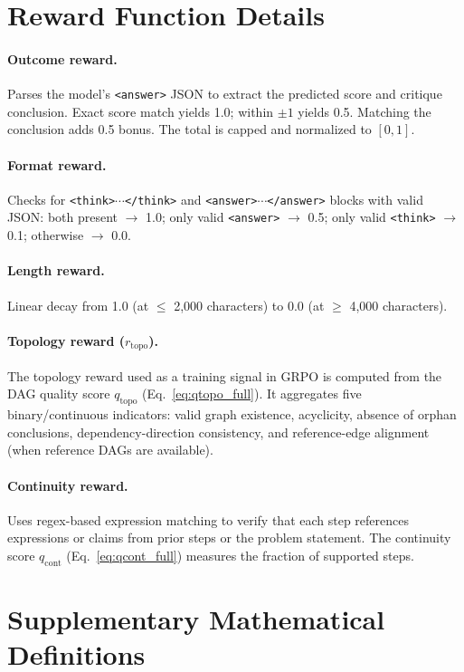 \section{Reward Function Details}
\label{app:rewards}

\paragraph{Outcome reward.}
Parses the model's \texttt{<answer>} JSON to extract the predicted score and critique conclusion.
Exact score match yields 1.0; within $\pm 1$ yields 0.5.
Matching the conclusion adds 0.5 bonus.
The total is capped and normalized to $[0, 1]$.

\paragraph{Format reward.}
Checks for \texttt{<think>$\cdots$</think>} and \texttt{<answer>$\cdots$</answer>} blocks with valid JSON:
both present $\to$ 1.0; only valid \texttt{<answer>} $\to$ 0.5; only valid \texttt{<think>} $\to$ 0.1; otherwise $\to$ 0.0.

\paragraph{Length reward.}
Linear decay from 1.0 (at $\leq$ 2,000 characters) to 0.0 (at $\geq$ 4,000 characters).

\paragraph{Topology reward ($r_{\mathrm{topo}}$).}
The topology reward used as a training signal in GRPO is computed from the DAG quality score $q_{\mathrm{topo}}$ (Eq.~\ref{eq:qtopo_full}).
It aggregates five binary/continuous indicators: valid graph existence, acyclicity, absence of orphan conclusions, dependency-direction consistency, and reference-edge alignment (when reference DAGs are available).

\paragraph{Continuity reward.}
Uses regex-based expression matching to verify that each step references expressions or claims from prior steps or the problem statement.
The continuity score $q_{\mathrm{cont}}$ (Eq.~\ref{eq:qcont_full}) measures the fraction of supported steps.

\section{Supplementary Mathematical Definitions}
\label{app:math_details}

